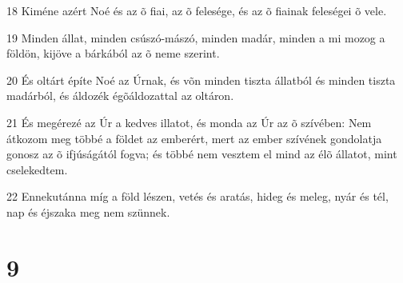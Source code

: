 \par 18 Kiméne azért Noé és az õ fiai, az õ felesége, és az õ fiainak feleségei õ vele.
\par 19 Minden állat, minden csúszó-mászó, minden madár, minden a mi mozog a földön, kijöve a bárkából az õ neme szerint.
\par 20 És oltárt építe Noé az Úrnak, és võn minden tiszta állatból és minden tiszta madárból, és áldozék égõáldozattal az oltáron.
\par 21 És megérezé az Úr a kedves illatot, és monda az Úr az õ szívében: Nem átkozom meg többé a földet az emberért, mert az ember szívének gondolatja gonosz az õ ifjúságától fogva; és többé nem vesztem el mind az élõ állatot, mint cselekedtem.
\par 22 Ennekutánna míg a föld lészen, vetés és aratás, hideg és meleg, nyár és tél, nap és éjszaka meg nem szünnek.

\chapter{9}

